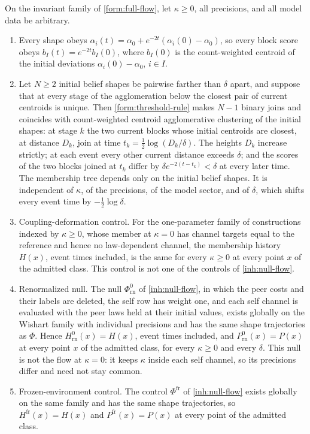 On the invariant family of \cref{form:full-flow}, let $\kappa\ge0$, all precisions, and all model data be arbitrary.
\begin{enumerate}
\item[(i)] Every shape obeys $\alpha_i(t)=\alpha_0+e^{-2t}(\alpha_i(0)-\alpha_0)$, so every block score obeys $b_I(t)=e^{-2t}b_I(0)$, where $b_I(0)$ is the count-weighted centroid of the initial deviations $\alpha_i(0)-\alpha_0$, $i\in I$.
\item[(ii)] Let $N\ge2$ initial belief shapes be pairwise farther than $\delta$ apart, and suppose that at every stage of the agglomeration below the closest pair of current centroids is unique. Then \cref{form:threshold-rule} makes $N-1$ binary joins and coincides with count-weighted centroid agglomerative clustering of the initial shapes: at stage $k$ the two current blocks whose initial centroids are closest, at distance $D_k$, join at time $t_k=\tfrac12\log(D_k/\delta)$. The heights $D_k$ increase strictly; at each event every other current distance exceeds $\delta$; and the scores of the two blocks joined at $t_k$ differ by $\delta e^{-2(t-t_k)}<\delta$ at every later time. The membership tree depends only on the initial belief shapes. It is independent of $\kappa$, of the precisions, of the model sector, and of $\delta$, which shifts every event time by $-\tfrac12\log\delta$.
\item[(iii)] Coupling-deformation control. For the one-parameter family of constructions indexed by $\kappa\ge0$, whose member at $\kappa=0$ has channel targets equal to the reference and hence no law-dependent channel, the membership history $H(x)$, event times included, is the same for every $\kappa\ge0$ at every point $x$ of the admitted class. This control is not one of the controls of \cref{inh:null-flow}.
\item[(iv)] Renormalized null. The null $\Phi^0_{\mathrm{rn}}$ of \cref{inh:null-flow}, in which the peer costs and their labels are deleted, the self row has weight one, and each self channel is evaluated with the peer laws held at their initial values, exists globally on the Wishart family with individual precisions and has the same shape trajectories as $\Phi$. Hence $H^0_{\mathrm{rn}}(x)=H(x)$, event times included, and $P^0_{\mathrm{rn}}(x)=P(x)$ at every point $x$ of the admitted class, for every $\kappa\ge0$ and every $\delta$. This null is not the flow at $\kappa=0$: it keeps $\kappa$ inside each self channel, so its precisions differ and need not stay common.
\item[(v)] Frozen-environment control. The control $\Phi^{\mathrm{fr}}$ of \cref{inh:null-flow} exists globally on the same family and has the same shape trajectories, so $H^{\mathrm{fr}}(x)=H(x)$ and $P^{\mathrm{fr}}(x)=P(x)$ at every point of the admitted class.
\end{enumerate}
